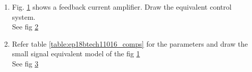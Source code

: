 \begin{enumerate}[label=\arabic*.,ref=\theenumi]


\item Fig. \ref{fig:ep18btech11016_circuit} shows a feedback current amplifier. Draw the equivalent control system.
\\
\solution See fig \ref{fig:ep18btech11016_block}
\\

\renewcommand{\thefigure}{\theenumi.\arabic{figure}}
\begin{figure}[!ht]
	\begin{center}
		\resizebox{\columnwidth}{!}{}
	\end{center}
\caption{}
\label{fig:ep18btech11016_circuit}
\end{figure}
%
\begin{figure}[!ht]
	\begin{center}
		\resizebox{\columnwidth}{!}{}
	\end{center}
\caption{}
\label{fig:ep18btech11016_block}
\end{figure}
\renewcommand{\thefigure}{\theenumi}


\item Refer table \ref{table:ep18btech11016_comps} for the parameters and draw the small signal equivalent model of the fig \ref{fig:ep18btech11016_circuit}
\\
\solution See fig \ref{fig:ep18btech11016_equi}
\\

\begin{table}[!ht]
    \centering
    
    \caption{}
    \label{table:ep18btech11016_comps}
\end{table}

\begin{figure}[!ht]
	\begin{center}
		\resizebox{\columnwidth}{!}{}
	\end{center}
\caption{}
\label{fig:ep18btech11016_equi}
\end{figure}



\end{enumerate}
